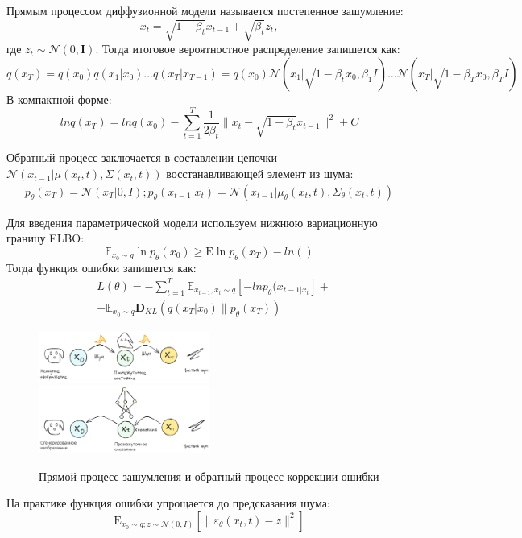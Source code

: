 Прямым процессом диффузионной модели называется 
постепенное зашумление:\begin{equation}
    x_t = \sqrt{1-\beta_t} x_{t-1} + \sqrt{\beta_t} z_t,
\end{equation}
где $z_t \sim \mathcal{N}(0,\mathbf{I})$. Тогда итоговое 
вероятностное распределение запишется как:
\begin{equation}
    q(x_{T}) = q(x_0)q(x_1|x_0) \dots q(x_T|x_{T-1}) =
    q(x_0) \mathcal{N}(x_1|\sqrt{1-\beta_t}x_0,\beta_1I)\dots
    \mathcal{N}(x_T|\sqrt{1-\beta_T}x_0,\beta_TI)
\end{equation}
В компактной форме:
\begin{equation}
    ln q(x_{T}) = ln q(x_0) - \sum_{t=1}^T \frac{1}{2\beta_t} \| x_t - \sqrt{1-\beta_t} x_{t-1} \|^2 + C
\end{equation}

Обратный процесс заключается в составлении цепочки 
$\mathcal{N}(x_{t-1}|\mu(x_t,t),\Sigma(x_t,t))$ восстанавливающей элемент из шума:
\begin{equation}
    \begin{aligned}
        p_\theta(x_T) = \mathcal{N}(x_T|0,I);
        p_\theta(x_{t-1}|x_t) = \mathcal{N}(x_{t-1}|\mu_\theta(x_t,t), \Sigma_\theta(x_t,t))
    \end{aligned}
\end{equation}

Для введения параметрической модели используем нижнюю вариационную границу ELBO:
\begin{equation}
    \mathbb{E}_{x_0 \sim q} \ln p_\theta(x_0) \ge \mathrm{E} \ln p_\theta(x_T) - ln()
\end{equation}
Тогда функция ошибки запишется как:\begin{equation}
    \begin{aligned}
        &L(\theta) = - \sum_{t=1}^T\mathbb{E}_{x_{t-1},x_t \sim q} \left[-ln p_\theta(x_{t-1|x_t}\right] + \\
        &+ \mathbb{E}_{x_0 \sim q} \mathbf{D}_{KL}(q(x_T|x_0) \parallel p_\theta (x_T))
    \end{aligned}
\end{equation}

\begin{figure}[h]
    \centering
    \includegraphics[width=0.5\textwidth]{assets/ml/generation/diffusion_1.excalidraw.png}
    \includegraphics[width=0.5\textwidth]{assets/ml/generation/diffusion_2.excalidraw.png}
    \caption{Прямой процесс зашумления и обратный процесс коррекции ошибки \cite{stablediffusion}}
    \label{sd_arch}
\end{figure}

На практике функция ошибки упрощается до предсказания шума:
\begin{equation}
    \mathrm{E}_{x_0 \sim q; z\sim \mathcal{N}(0,I)} 
    \left[ \| \varepsilon_\theta(x_t,t) -z \|^2\right]
\end{equation}


